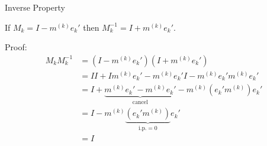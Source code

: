 \documentclass[10pt]{beamer}
\begin{document}
    

\begin{frame}[shrink]{Inverse Property}
\begin{theorem}
If $M_k = I - m^{(k)} e_k'$ then $M_k^{-1} = I+ m^{(k)} e_k'$. 
\end{theorem}
Proof: 
\begin{align*}
    M_k M_k^{-1} &= (I - m^{(k)} e_k')(I + m^{(k)} e_k') \\
    &= II + Im^{(k)} e_k' - m^{(k)} e_k'I - m^{(k)} e_k' m^{(k)} e_k' \\
    &= I + \underbrace{m^{(k)} e_k' - m^{(k)} e_k'}_{\text{cancel}} - m^{(k)} (e_k' m^{(k)}) e_k' \\
    &= I -  m^{(k)} \underbrace{(e_k' m^{(k)})}_{\text{i.p.}=0} e_k' \\
    &= I 
\end{align*}

\end{frame}
\end{document}
